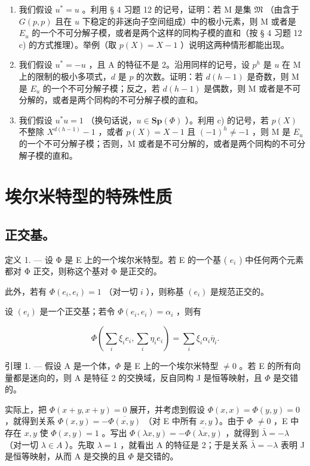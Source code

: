 \begin{enumerate}
\def\labelenumi{\alph{enumi})}
\setcounter{enumi}{1}
\item
  我们假设 \(u^{*} = u\) 。利用 § 4 习题 12 的记号，证明：若 M 是集 \(\mathfrak{M}\) （由含于 \(G(p, p)\) 且在 \(u\) 下稳定的非迷向子空间组成）中的极小元素，则 M 或者是 \(E_{u}\) 的一个不可分解子模，或者是两个这样的同构子模的直和（按 § 4 习题 12 c) 的方式推理）。举例（取 \(p(X) = X - 1\) ）说明这两种情形都能出现。
\item
  我们假设 \(u^* = -u\) ，且 A 的特征不是 2。沿用同样的记号，设 \(p^h\) 是 \(u\) 在 M 上的限制的极小多项式，\(d\) 是 \(p\) 的次数。证明：若 \(d(h - 1)\) 是奇数，则 M 是 \(E_u\) 的一个不可分解子模；反之，若 \(d(h - 1)\) 是偶数，则 M 或者是不可分解的，或者是两个同构的不可分解子模的直和。
\item
  我们假设 \(u^{*}u = 1\) （换句话说，\(u \in \mathbf{Sp}(\Phi)\) ）。利用 c) 的记号，若 \(p(X)\) 不整除 \(X^{d(h-1)} - 1\) ，或者 \(p(X) = X - 1\) 且 \((-1)^{h} \neq -1\) ，则 M 是 \(E_{u}\) 的一个不可分解子模；否则，M 或者是不可分解的，或者是两个同构的不可分解子模的直和。
\end{enumerate}

\section{埃尔米特型的特殊性质}

\subsection{正交基。}

定义 1. --- 设 Φ 是 E 上的一个埃尔米特型。若 E 的一个基 ( \(e_{i}\) ) 中任何两个元素都对 Φ 正交，则称这个基对 Φ 是正交的。

此外，若有 \(\Phi(e_i, e_i) = 1\) （对一切 \(i\) ），则称基 \((e_i)\) 是规范正交的。

设 \((e_i)\) 是一个正交基；若令 \(\Phi(e_i, e_i) = \alpha_i\) ，则有

\[
\Phi (\sum_ {i} \xi_ {i} e _ {i}, \sum_ {i} \eta_ {i} e _ {i}) = \sum_ {i} \xi_ {i} \alpha_ {i} \overline {{\eta}} _ {i}.\tag{1}
\]

引理 1. --- 假设 A 是一个体，\(\Phi\) 是 E 上的一个埃尔米特型 \(\neq 0\) 。若 E 的所有向量都是迷向的，则 A 是特征 2 的交换域，反自同构 J 是恒等映射，且 \(\Phi\) 是交错的。

实际上，把 \(\Phi(x+y, x+y)=0\) 展开，并考虑到假设 \(\Phi(x,x)=\Phi(y,y)=0\) ，就得到关系 \(\Phi(x,y)=-\overline{\Phi(x,y)}\) （对 E 中所有 \(x,y\) ）。由于 \(\Phi\) \(\neq 0\) ，E 中存在 \(x,y\) 使 \(\Phi(x,y)=1\) 。写出 \(\Phi(\lambda x,y)=-\overline{\Phi(\lambda x,y)}\) ，就得到 \(\bar{\lambda}=-\lambda\) （对一切 \(\lambda\in A\) ）。先取 \(\lambda=1\) ，就看出 A 的特征是 2；于是关系 \(\bar{\lambda}=-\lambda\) 表明 J 是恒等映射，从而 A 是交换的且 \(\Phi\) 是交错的。

